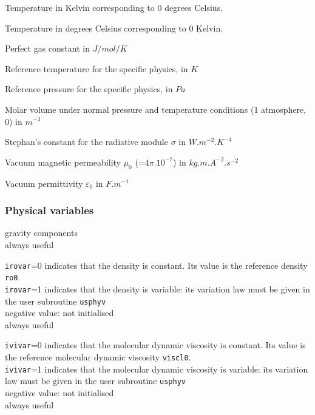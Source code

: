 {Temperature in Kelvin corresponding to 0 degrees Celsius.}

{Temperature in degrees Celsius corresponding to 0 Kelvin.}

{Perfect gas constant in $J/mol/K$}

{Reference temperature for the specific physics, in $K$}

{Reference pressure for the specific physics, in $Pa$}

{Molar volume under normal pressure and temperature conditions (1 atmosphere,
0\degresC) in $m^{-3}$}

{Stephan's constant for the radiative module $\sigma$ in $W.m^{-2}.K^{-4}$}

{Vacuum magnetic permeability $\mu_0$ (=$4\pi.10^{-7}$) in $kg.m.A^{-2}.s^{-2}$}

{Vacuum permittivity $\varepsilon_0$ in $F.m^{-1}$}


\subsubsection{Physical variables}

{gravity components\\
always useful }

{{\tt irovar}=0 indicates that the density is
constant. Its value is the reference density {\tt ro0}.\\
{\tt irovar}=1 indicates that the density is variable: its variation
law must be given in the user subroutine \texttt{usphyv}\\
negative value: not initialised\\
always useful}

{{\tt ivivar}=0 indicates that the molecular
dynamic viscosity is constant. Its value is the reference molecular
dynamic viscosity {\tt viscl0}.\\
{\tt ivivar}=1 indicates that the molecular dynamic viscosity is
variable: its variation law must be given in the user subroutine
\texttt{usphyv}\\
negative value: not initialised\\
always useful}


